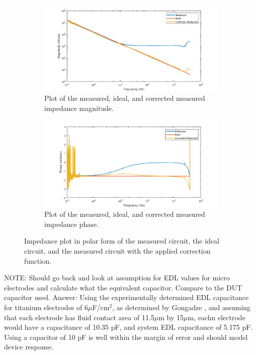 \begin{figure}[h]
\centering
\begin{subfigure}[b]{\textwidth}
    \centering
    \includegraphics[width=\textwidth]{images/CorrectedImpedanceMag.png}
    \caption{Plot of the measured, ideal, and corrected measured impedance magnitude.}
\end{subfigure}

\begin{subfigure}[b]{\textwidth}
    \centering
    \includegraphics[width=\textwidth]{images/CorrectedImpedancePhase.png}
    \caption{Plot of the measured, ideal, and corrected measured impedance phase.}
\end{subfigure}

\caption{Impedance plot in polar form of the measured circuit, the ideal circuit, and the measured circuit with the applied correction function.}
\label{fig:IS_validation_corrected_spectra_comp}
\end{figure}

\par NOTE: Should go back and look at assumption for EDL values for micro electrodes and calculate what the equivalent capacitor. Compare to the DUT capacitor used. Answer: Using the experimentally determined EDL capacitance for titanium electrodes of 6$\mu$F/cm$^2$, as determined by Gongadze \cite{_gongadze.pdf_????}, and assuming that each electrode has fluid contact area of 11.5$\mu$m by 15$\mu$m, eachn electrode would have a capacitance of 10.35 pF, and system EDL capacitance of 5.175 pF. Using a capacitor of 10 pF is well within the margin of error and should model device response. 

